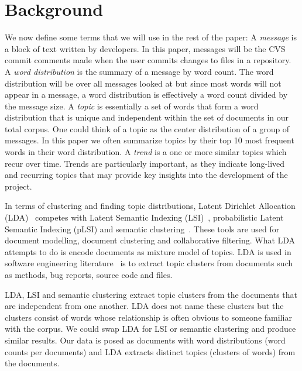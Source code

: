 \documentclass[times, 10pt,twocolumn]{article}
\begin{document}
\section{Background}

We now define some terms that we will use in the rest of the paper: A
\emph{message} is a block of text written by developers. In this
paper, messages will be the CVS commit comments made when the user
commits changes to files in a repository. A \emph{word distribution}
is the summary of a message by word count. The word distribution will
be over all messages looked at but since most words will not appear in
a message, a word distribution is effectively a word count divided by
the message size. A \emph{topic} is essentially a set of words that
form a word distribution that is unique and independent within the set
of documents in our total corpus. One could think of a topic as the
center distribution of a group of messages. In this paper we often
summarize topics by their top 10 most frequent words in their word
distribution.  A \emph{trend} is a one or more similar topics which
recur over time.  Trends are particularly important, as they indicate
long-lived and recurring topics that may provide key insights into the
development of the project.


In terms of clustering and finding topic distributions, Latent
Dirichlet Allocation (LDA)~\cite{944937} competes with Latent Semantic
Indexing (LSI)~\cite{1421013,1374321,10.1109/ICPC.2007.13,10.1109/ICPC.2006.17}, probabilistic Latent Semantic Indexing (pLSI) and
semantic clustering~\cite{1698774,1566153}. These tools are used for document modelling,
document clustering and collaborative filtering. What LDA attempts to
do is encode documents as mixture model of topics.  LDA is used in
software engineering
literature~\cite{lukins2008,10.1109/MSR.2007.20,NIPS2007637,1321709}
is to extract topic clusters from documents such as methods, bug
reports, source code and files.

LDA, LSI and semantic clustering extract topic
clusters from the documents that are independent from one another. LDA
does not name these clusters but the clusters consist of words whose
relationship is often obvious to someone familiar with the corpus. We
could swap LDA for LSI or semantic clustering and produce similar
results. Our data is posed as documents with word distributions (word
counts per documents) and LDA extracts distinct topics (clusters of
words) from the documents.
\end{document}
